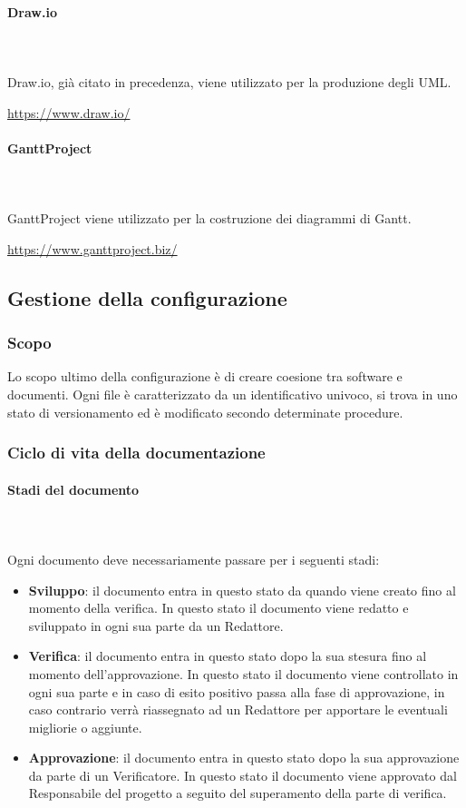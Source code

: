 		\paragraph{Draw.io} \mbox{}\\ \mbox{}\\
		Draw.io, già citato in precedenza, viene utilizzato per la produzione degli UML\glo. \newline
		\centerline{\url{https://www.draw.io/}}
		
		\paragraph{GanttProject} \mbox{}\\ \mbox{}\\
		GanttProject viene utilizzato per la costruzione dei diagrammi				di Gantt\glo. \newline
		\centerline{\url{https://www.ganttproject.biz/}}
		
	\subsection{Gestione della configurazione}
	\subsubsection{Scopo}
	Lo scopo ultimo della configurazione è di creare coesione tra software e documenti. Ogni file è caratterizzato da un identificativo univoco, si trova in uno stato di versionamento ed è modificato secondo determinate procedure.
	\subsubsection{Ciclo di vita della documentazione}
	\paragraph{Stadi del documento} \mbox{}\\ \mbox{}\\
	Ogni documento deve necessariamente passare per i seguenti stadi:
	\begin{itemize}
		\item \textbf{Sviluppo}: il documento entra in questo stato da quando viene creato fino al momento della verifica. In questo stato il documento viene redatto e sviluppato in ogni sua parte da un Redattore.
		\item \textbf{Verifica}: il documento entra in questo stato dopo la sua stesura fino al momento dell'approvazione. In questo stato il documento viene controllato in ogni sua parte e in caso di esito positivo passa alla fase di approvazione, in caso contrario verrà riassegnato ad un Redattore per apportare le eventuali migliorie o aggiunte.
		\item \textbf{Approvazione}: il documento entra in questo stato dopo la sua approvazione da parte di un Verificatore. In questo stato il documento viene approvato dal Responsabile del progetto a seguito del superamento della parte di verifica.
	\end{itemize}
